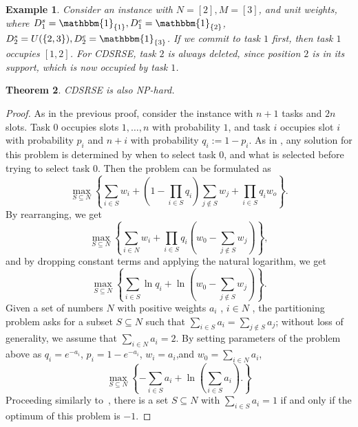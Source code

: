 \documentclass[final,5p,times,twocolumn]{elsarticle}
\newtheorem{theorem}{Theorem}[section]
\newtheorem{example}[theorem]{Example}
\begin{document}
\begin{example}
\label{eg:2}
    Consider an instance with $N=[2],M=[3]$, and unit weights, where $D_1^s=\mathbbm{1}_{\{1\}},D_1^e=\mathbbm{1}_{\{2\}}$, $D_2^s=U(\{2,3\}),D_2^e=\mathbbm{1}_{\{3\}}$.
If we commit to task $1$ first, then task $1$ occupies $[1,2]$.
For CDSRSE, task $2$ is always deleted, since position $2$ is in its support, which is now occupied by task $1$.
\end{example}
\begin{theorem}%
    CDSRSE is also NP-hard.
\end{theorem}
\begin{proof}
    As in the previous proof, consider the instance with $n+1$ tasks and $2n$ slots. 
    Task $0$ occupies slots $1,\ldots,n$ with probability $1$, and task $i$ occupies slot $i$ with probability $p_i$ and $n+i$ with probability $q_i:=1-p_i$.
    As in \cite{DNP}, any solution for this problem is determined by when to select task $0$, and what is selected before trying to select task $0$.
    Then the problem can be formulated as
    \begin{equation}
    \label{Conserv-JS}
    \tag{Conserv-JS}
    \max_{S\subseteq N}\left\{\sum_{i\in S}w_i+(1-\prod_{i\in S}q_i)\sum_{j\notin S}w_j+\prod_{i\in S}q_iw_o\right\}.
    \end{equation}
    By rearranging, we get 
    \[\max_{S\subseteq N}\left\{\sum_{i\in N}w_i+\prod_{i\in S}q_i(w_0-\sum_{j\notin S}w_j)\right\},\]
    and by dropping constant terms and applying the natural logarithm, we get 
    \[\max_{S\subseteq N}\left\{\sum_{i\in S}\ln q_i+\ln(w_0-\sum_{j\notin S}w_j)\right\}.\]
    Given a set of numbers $N$ with positive weights $a_i$ , $i \in N$ , the partitioning problem asks for a subset $S \subseteq N$ such that $\sum_{i\in S}a_i = \sum_{j\notin S} a_j$; without loss of generality, we assume that $\sum_{i\in N} a_i = 2$.
    By setting parameters of the problem above as $q_i = e^{-a_i}$, $p_i = 1-e^{-a_i}$, $w_i =a_i$,and $w_0 = \sum_{i\in N} a_i$,
    \[\max_{S\subseteq N}\left\{-\sum_{i\in S}a_i+\ln(\sum_{i \in S}a_i).\right\}\]
Proceeding similarly to~\cite{Star-Graph-NP-hard}, there is a set $S \subseteq N$ with $\sum_{i\in S}a_i=1$ if and only if the optimum of this problem is $-1$.
\end{proof}
\end{document}
